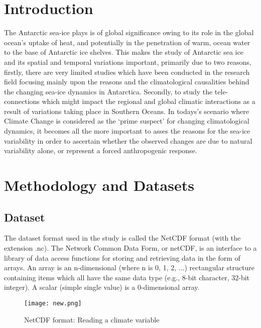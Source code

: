 \documentclass{article} %
\begin{document}
\newpage


\section{Introduction}

The Antarctic sea-ice plays is of global significance owing to its role in the global ocean's uptake of heat, and potentially in the penetration of warm, ocean water to the base of Antarctic ice shelves. This makes the study of Antarctic sea ice and its spatial and temporal variations important, primarily due to two reasons, firstly, there are very limited studies which have been conducted in the research field focusing mainly upon the reasons and the climatological causalities behind the changing sea-ice dynamics in Antarctica. Secondly, to study the tele-connections which might impact the regional and global climatic interactions as a result of variations taking place in Southern Oceans. In todays’s scenario where Climate Change is considered as the ‘prime suspect’ for changing climatological dynamics, it becomes all the more important to asses the reasons for the sea-ice variability in order to ascertain whether the observed changes are due to natural variability alone, or represent a forced anthropogenic response. 

\section{Methodology and Datasets}
\subsection{Dataset}

The dataset format used in the study is called the NetCDF format (with the extension .nc). The Network Common Data Form, or netCDF, is an interface to a library of data access functions for storing and retrieving data in the form of arrays. An array is an n-dimensional (where n is 0, 1, 2, ...) rectangular structure containing items which all have the same data type (e.g., 8-bit character, 32-bit integer). A scalar (simple single value) is a 0-dimensional array. \\

\begin{figure}[h]
    \centering
    \texttt{[image: new.png]}%
    \caption{NetCDF format: Reading a climate variable}
    \label{fig:NetCDF} %
\end{figure}\\
\end{document}
